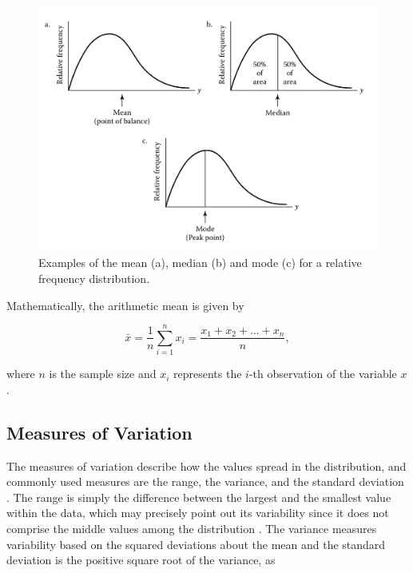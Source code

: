 \begin{figure}[H]
	\centering
	\caption{\label{fig:central_tendency} Examples of the mean (a), median (b) and mode (c) for a relative frequency distribution.}
	\begin{center}
    \includegraphics[scale=0.4]{images/central_tendency.png}
	\end{center}
	\centering
\end{figure}

Mathematically, the arithmetic mean is given by

\begin{equation}
\label{eqn:arithmetic_mean}
\bar{x} = \frac{1}{n} \sum_{i=1}^{n} x_{i} = \frac{x_{1} + x_{2} + \dots + x_{n}}{n},
\end{equation}

\noindent where $n$ is the sample size and $x_{i}$ represents the $i$-th observation of the variable $x$ \cite{zwillinger1999crc}.

\subsection{Measures of Variation}

The measures of variation describe how the values spread in the distribution, and commonly used measures are the range, the variance, and the standard deviation \cite{mendenhall2016statistics}. The range is simply the difference between the largest and the smallest value within the data, which may precisely point out its variability since it does not comprise the middle values among the distribution \cite{devore2011probability}. The variance measures variability based on the squared deviations about the mean and the standard deviation is the positive square root of the variance, as

